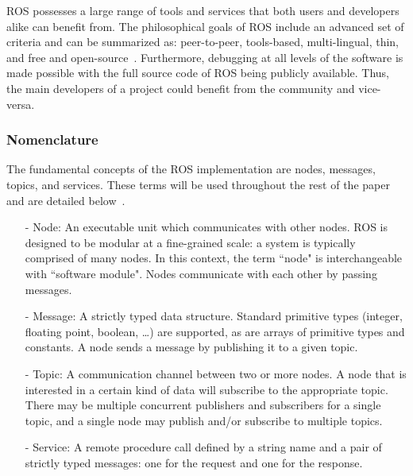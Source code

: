 ROS possesses a large range of tools and services that both users and developers alike can benefit from. The philosophical goals of ROS include an advanced set of criteria and can be summarized as: peer-to-peer, tools-based, multi-lingual, thin, and free and open-source~\cite{QUIGLEY.ICRA.2009}. Furthermore, debugging at all levels of the software is made possible with the full source code of ROS being publicly available. Thus, the main developers of a project could benefit from the community and vice-versa.

\subsubsection*{Nomenclature}

The fundamental concepts of the ROS implementation are
nodes, messages, topics, and services. These terms will be used throughout the rest of the paper and are detailed below~\cite{QUIGLEY.ICRA.2009}.
\begin{itemize}
\item[-] Node: An executable unit which communicates with other nodes. ROS is
designed to be modular at a fine-grained scale: a system
is typically comprised of many nodes. In this context, the
term ``node" is interchangeable with ``software module". Nodes communicate with each other by passing messages.
\item[-] Message: A strictly typed data structure. Standard
primitive types (integer, floating point, boolean, \ldots) are
supported, as are arrays of primitive types and constants. A node sends a message by publishing it to a given topic.
\item[-] Topic: A communication channel between two or more
nodes. A node that is interested in a certain kind of data will subscribe
to the appropriate topic. There may be multiple concurrent
publishers and subscribers for a single topic, and a single
node may publish and/or subscribe to multiple topics.
\item[-] Service: A remote procedure call defined by a string name and a pair
of strictly typed messages: one for the request and one for
the response.
\end{itemize}